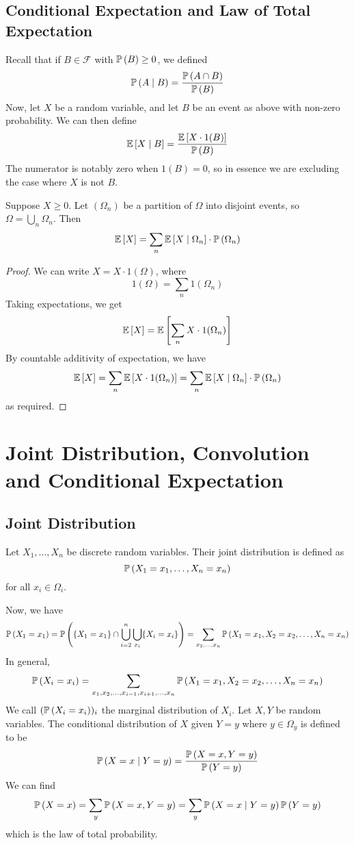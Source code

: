 \documentclass{article}
\begin{document}
\subsection{Conditional Expectation and Law of Total Expectation}
Recall that if $B \in \mathcal F$ with $\mathbb{P}\left({B}\right) \geq 0$, we defined
\[ \mathbb{P}\left({A \mid B}\right) = \frac{\mathbb{P}\left({A \cap B}\right)}{\mathbb{P}\left({B}\right)} \]
Now, let $X$ be a random variable, and let $B$ be an event as above with non-zero probability. We can then define
\[ \mathbb{E}\left[{X \mid B}\right] = \frac{\mathbb{E}\left[{X \cdot 1(B)}\right]}{\mathbb{P}\left({B}\right)} \]
The numerator is notably zero when $1(B) = 0$, so in essence we are excluding the case where $X$ is not $B$.
\begin{theorem}
    Suppose $X \geq 0$. Let $(\Omega_n)$ be a partition of $\Omega$ into disjoint events, so $\Omega = \bigcup_n \Omega_n$. Then
    \[ \mathbb{E}\left[{X}\right] = \sum_n \mathbb{E}\left[{X \mid \Omega_n}\right] \cdot \mathbb{P}\left({\Omega_n}\right) \]
\end{theorem}
\begin{proof}
    We can write $X = X \cdot 1(\Omega)$, where
    \[ 1(\Omega) = \sum_n 1(\Omega_n) \]
    Taking expectations, we get
    \[ \mathbb{E}\left[{X}\right] = \mathbb{E}\left[{ \sum_{n} X \cdot 1(\Omega_n) }\right] \]
    By countable additivity of expectation, we have
    \[ \mathbb{E}\left[{X}\right] = \sum_{n} \mathbb{E}\left[{ X \cdot 1(\Omega_n) }\right] = \sum_n \mathbb{E}\left[{X \mid \Omega_n}\right] \cdot \mathbb{P}\left({\Omega_n}\right) \]
    as required.
\end{proof}

\section{Joint Distribution, Convolution and Conditional Expectation}
\subsection{Joint Distribution}
\begin{definition}
    Let $X_1, \dots, X_n$ be discrete random variables. Their joint distribution is defined as
    \[ \mathbb{P}\left({X_1 = x_1, \dots, X_n = x_n}\right) \]
    for all $x_i \in \Omega_i$.
\end{definition}
\noindent Now, we have
\[ \mathbb{P}\left({X_1 = x_1}\right) = \mathbb{P}\left({\{ X_1 = x_1\} \cap \bigcup_{i=2}^n \bigcup_{x_i} \{ X_i = x_i \} }\right) = \sum_{x_2, \dots, x_n} \mathbb{P}\left({X_1 = x_1, X_2 = x_2, \dots, X_n = x_n}\right) \]
In general,
\[ \mathbb{P}\left({X_i = x_i}\right) = \sum_{x_1, x_2, \dots, x_{i-1}, x_{i+1}, \dots, x_n} \mathbb{P}\left({X_1 = x_1, X_2 = x_2, \dots, X_n = x_n}\right) \]
We call $(\mathbb{P}\left({X_i = x_i}\right))_i$ the marginal distribution of $X_i$. Let $X, Y$ be random variables. The conditional distribution of $X$ given $Y = y$ where $y \in \Omega_y$ is defined to be
\[ \mathbb{P}\left({X = x \mid Y = y}\right) = \frac{\mathbb{P}\left({X = x, Y = y}\right)}{\mathbb{P}\left({Y = y}\right)} \]
We can find
\[ \mathbb{P}\left({X = x}\right) = \sum_y \mathbb{P}\left({X = x, Y = y}\right) = \sum_y \mathbb{P}\left({X = x \mid Y = y}\right) \mathbb{P}\left({Y = y}\right) \]
which is the law of total probability.
\end{document}
